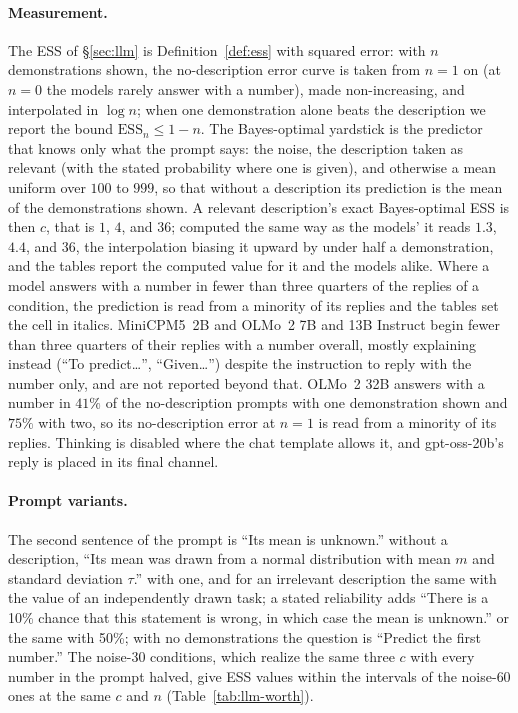 \documentclass{article}
\newcommand{\ess}{\mathrm{ESS}}
\begin{document}
\paragraph{Measurement.} The ESS of \S\ref{sec:llm} is Definition~\ref{def:ess} with squared error: with $n$ demonstrations shown, the no-description error curve is taken from $n = 1$ on (at $n = 0$ the models rarely answer with a number), made non-increasing, and interpolated in $\log n$; when one demonstration alone beats the description we report the bound $\ess_n \le 1 - n$. The Bayes-optimal yardstick is the predictor that knows only what the prompt says: the noise, the description taken as relevant (with the stated probability where one is given), and otherwise a mean uniform over $100$ to $999$, so that without a description its prediction is the mean of the demonstrations shown. A relevant description's exact Bayes-optimal ESS is then $c$, that is $1$, $4$, and $36$; computed the same way as the models' it reads $1.3$, $4.4$, and $36$, the interpolation biasing it upward by under half a demonstration, and the tables report the computed value for it and the models alike. Where a model answers with a number in fewer than three quarters of the replies of a condition, the prediction is read from a minority of its replies and the tables set the cell in italics. MiniCPM5~2B \citep{minicpm5} and OLMo~2 7B and 13B Instruct begin fewer than three quarters of their replies with a number overall, mostly explaining instead (``To predict\ldots'', ``Given\ldots'') despite the instruction to reply with the number only, and are not reported beyond that. OLMo~2 32B answers with a number in $41\%$ of the no-description prompts with one demonstration shown and $75\%$ with two, so its no-description error at $n = 1$ is read from a minority of its replies. Thinking is disabled where the chat template allows it, and gpt-oss-20b's reply is placed in its final channel.

\paragraph{Prompt variants.} The second sentence of the prompt is ``Its mean is unknown.'' without a description, ``Its mean was drawn from a normal distribution with mean $m$ and standard deviation $\tau$.'' with one, and for an irrelevant description the same with the value of an independently drawn task; a stated reliability adds ``There is a 10\% chance that this statement is wrong, in which case the mean is unknown.'' or the same with 50\%; with no demonstrations the question is ``Predict the first number.'' The noise-$30$ conditions, which realize the same three $c$ with every number in the prompt halved, give ESS values within the intervals of the noise-$60$ ones at the same $c$ and $n$ (Table~\ref{tab:llm-worth}).
\end{document}
